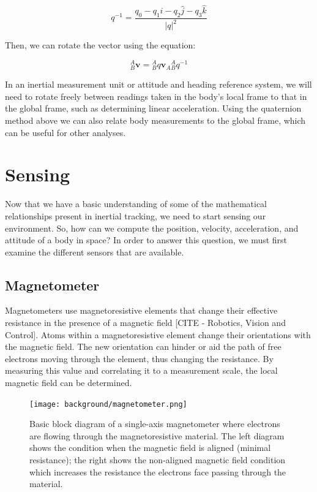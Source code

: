 \begin{equation}
    q^{-1} = \frac{q_0 - q_1\hat{i} - q_2\hat{j} - q_3\hat{k}}{|q|^2}
\end{equation}

Then, we can rotate the vector using the equation:

\begin{equation}
    {}^A_B \pmb{v} = {}^A_Bq \pmb{v}_A {}^A_Bq^{-1}
\end{equation}

In an inertial measurement unit or attitude and heading reference system, we will need to rotate freely between readings taken in the body's local frame to that in the global frame, such as determining linear acceleration.
Using the quaternion method above we can also relate body measurements to the global frame, which can be useful for other analyses.

\section{Sensing} \label{sec:sensing}
Now that we have a basic understanding of some of the mathematical relationships present in inertial tracking, we need to start sensing our environment.
So, how can we compute the position, velocity, acceleration, and attitude of a body in space?
In order to answer this question, we must first examine the different sensors that are available.

\subsection{Magnetometer} \label{ssec:magnetometer}
Magnetometers use magnetoresistive elements that change their effective resistance in the presence of a magnetic field [CITE - Robotics, Vision and Control].
Atoms within a magnetoresistive element change their orientations with the magnetic field.
The new orientation can hinder or aid the path of free electrons moving through the element, thus changing the resistance.
By measuring this value and correlating it to a measurement scale, the local magnetic field can be determined.

\begin{figure}[h!]
    \caption[Magnetometer block diagram]{Basic block diagram of a single-axis magnetometer where electrons are flowing through the magnetoresistive material. The left diagram shows the condition when the magnetic field is aligned (minimal resistance); the right shows the non-aligned magnetic field condition which increases the resistance the electrons face passing through the material.}
    \label{fig:magnetometer}
    \centering
    \texttt{[image: background/magnetometer.png]}
\end{figure}

